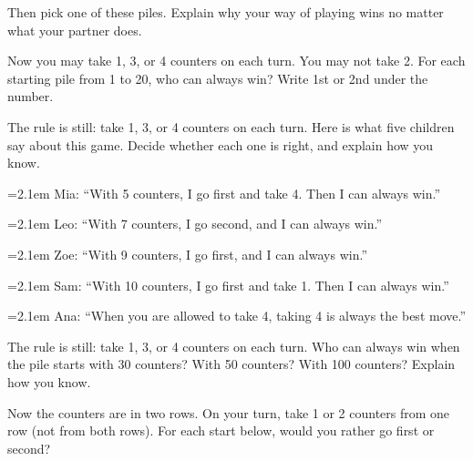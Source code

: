 \vspace{6mm}
Then pick one of these piles. Explain why your way of playing wins no matter what your partner does.

\newpage
{} Now you may take 1, 3, or 4 counters on each turn. You may not take 2. For each starting pile from 1 to 20, who can always win? Write 1st or 2nd under the number.

\vspace{4mm}
\twenty

\newpage
{} The rule is still: take 1, 3, or 4 counters on each turn. Here is what five children say about this game. Decide whether each one is right, and explain how you know.

\newcommand{\claim}[3]{\vspace{5mm}\par\hangindent=2.1em
  \makebox[0pt][r]{#1\hspace{0.6em}}#2: “#3”\par\vspace{30mm}}
\claim{(a)}{Mia}{With 5 counters, I go first and take 4. Then I can always win.}
\claim{(b)}{Leo}{With 7 counters, I go second, and I can always win.}
\claim{(c)}{Zoe}{With 9 counters, I go first, and I can always win.}
\claim{(d)}{Sam}{With 10 counters, I go first and take 1. Then I can always win.}
\claim{(e)}{Ana}{When you are allowed to take 4, taking 4 is always the best move.}

\newpage
{} The rule is still: take 1, 3, or 4 counters on each turn. Who can always win when the pile starts with 30 counters? With 50 counters? With 100 counters? Explain how you know.

\vspace{8mm}
\hspace*{2.1em}\blank{4cm}

\vspace{6mm}
\hspace*{2.1em}\blank{4cm}

\vspace{6mm}
\hspace*{2.1em}\blank{4cm}

\newpage
{} Now the counters are in two rows. On your turn, take 1 or 2 counters from one row (not from both rows). For each start below, would you rather go first or second?

